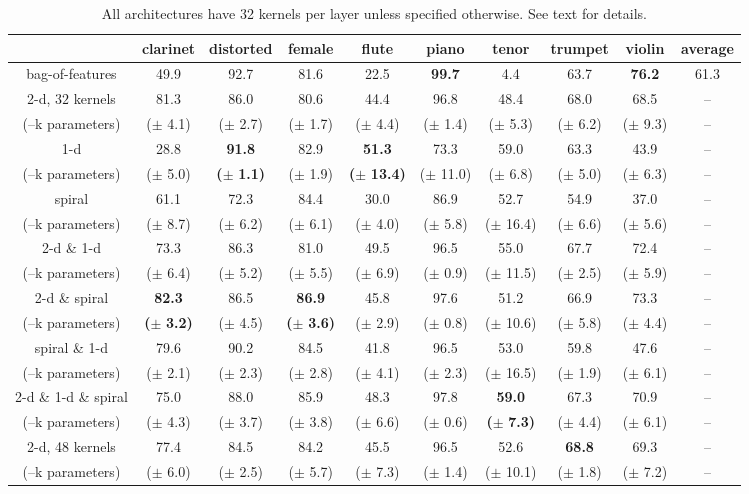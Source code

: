 \documentclass{article}
\newcommand*{\s}[1]{\small{($\pm$ #1)}}
\newcommand*{\g}[1]{\small{\textbf{(}$\boldsymbol{\pm}$ \textbf{#1}\textbf{)}}}
\begin{document}
\begin{table}[t]
	\begin{center}
	\setlength{\unitlength}{1cm}
	\begin{tabular}{|c|cccccccc|c|}
		\hline
		& clarinet & distorted & female & flute & piano & tenor & trumpet & violin & average \\
		\hline
		bag-of-features
		& 49.9 & 92.7 & 81.6 & 22.5 & \textbf{99.7} & \hphantom{0}4.4 & 63.7 & \textbf{76.2} & 61.3 \\
		\hline
		2-d, $32$ kernels
		& 81.3 & 86.0 & 80.6 & 44.4 & 96.8 & 48.4 & 68.0 & 68.5 & -- \\		
		(--k parameters)
		&\s{4.1}&\s{2.7}&\s{1.7}&\s{4.4}&\s{1.4}&\s{5.3}&\s{6.2}&\s{9.3}& -- \\
		\hline
		1-d
		& 28.8 & \textbf{91.8} & 82.9 & \textbf{51.3} & 73.3 & 59.0 & 63.3 & 43.9 & -- \\
		(--k parameters)
		&\s{5.0}&\g{1.1}&\s{1.9}&\g{13.4}&\s{11.0}&\s{6.8}&\s{5.0}&\s{6.3}&-- \\
		\hline
		spiral
		& 61.1 & 72.3 & 84.4 & 30.0 & 86.9 & 52.7 & 54.9 & 37.0 & -- \\
		(--k parameters)
		&\s{8.7}&\s{6.2}&\s{6.1}&\s{4.0}&\s{5.8}&\s{16.4}&\s{6.6}&\s{5.6}&--\\
		\hline
		2-d \& 1-d
		& 73.3 & 86.3 & 81.0 & 49.5 & 96.5 & 55.0 & 67.7 & 72.4 & -- \\
		(--k parameters)
		&\s{6.4}&\s{5.2}&\s{5.5}&\s{6.9}&\s{0.9}&\s{11.5}&\s{2.5}&\s{5.9}&--\\
		\hline
		2-d \& spiral
		& \textbf{82.3} & 86.5 & \textbf{86.9} & 45.8 & 97.6 & 51.2 & 66.9 & 73.3 & -- \\
		(--k parameters)
		&\g{3.2}&\s{4.5}&\g{3.6}&\s{2.9}&\s{0.8}&\s{10.6}&\s{5.8}&\s{4.4}&--\\
		\hline
		spiral \& 1-d
		& 79.6 & 90.2 & 84.5 & 41.8 & 96.5 & 53.0 & 59.8 & 47.6 & -- \\
		(--k parameters)
		&\s{2.1}&\s{2.3}&\s{2.8}&\s{4.1}&\s{2.3}&\s{16.5}&\s{1.9}&\s{6.1}&--\\
		\hline
		2-d \& 1-d \& spiral
		& 75.0 & 88.0 & 85.9 & 48.3 & 97.8 & \textbf{59.0} & 67.3 & 70.9 & --  \\
		(--k parameters)
		&\s{4.3}&\s{3.7}&\s{3.8}&\s{6.6}&\s{0.6}&\g{7.3}&\s{4.4}&\s{6.1}&--\\
		\hline
		2-d, 48 kernels
		& 77.4 & 84.5 & 84.2 & 45.5 & 96.5 & 52.6 & \textbf{68.8} & 69.3 & --\\
		(--k parameters)
		&\s{6.0}&\s{2.5}&\s{5.7}&\s{7.3}&\s{1.4}&\s{10.1}&\s{1.8}&\s{7.2}&--\\
		\hline
	\end{tabular}
	\end{center}
	\caption{All architectures have 32 kernels per layer unless specified otherwise.
	See text for details.\label{table:results}}
\end{table}
\end{document}
